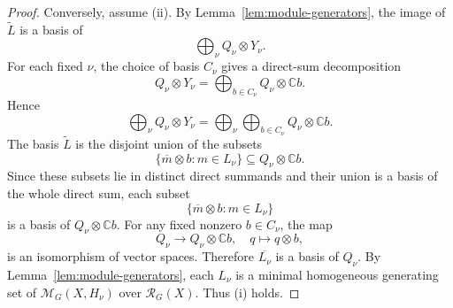 \documentclass[11pt]{article}
\newcommand{\dsC}{\mathbb{C}}
\newcommand{\scM}{\mathcal{M}}
\newcommand{\scR}{\mathcal{R}}
\theoremstyle{definition}
\begin{document}
\begin{proof}
  Conversely, assume \textup{(ii)}.
  By Lemma~\ref{lem:module-generators}, the image of $\widetilde L$ is a basis of
  \[
    \bigoplus_{\nu} Q_\nu\otimes Y_\nu.
  \]
  For each fixed $\nu$, the choice of basis $C_\nu$ gives a direct-sum decomposition
  \[
    Q_\nu\otimes Y_\nu
    =
    \bigoplus_{b\in C_\nu} Q_\nu\otimes \dsC b.
  \]
  Hence
  \[
    \bigoplus_{\nu} Q_\nu\otimes Y_\nu
    =
    \bigoplus_{\nu}\bigoplus_{b\in C_\nu} Q_\nu\otimes \dsC b.
  \]
  The basis $\widetilde L$ is the disjoint union of the subsets
  \[
    \{\overline{m}\otimes b : m\in L_\nu\}
    \subseteq
    Q_\nu\otimes \dsC b.
  \]
  Since these subsets lie in distinct direct summands and their union is a basis of the whole direct sum, each subset
  \[
    \{\overline{m}\otimes b : m\in L_\nu\}
  \]
  is a basis of $Q_\nu\otimes \dsC b$.
  For any fixed nonzero $b\in C_\nu$, the map
  \[
    Q_\nu \longrightarrow Q_\nu\otimes \dsC b,
    \quad
    q\longmapsto q\otimes b,
  \]
  is an isomorphism of vector spaces.
  Therefore $\overline{L_\nu}$ is a basis of $Q_\nu$.
  By Lemma~\ref{lem:module-generators}, each $L_\nu$ is a minimal homogeneous generating set of $\scM_G(X,H_\nu)$ over $\scR_G(X)$.
  Thus \textup{(i)} holds.
\end{proof}
\end{document}
